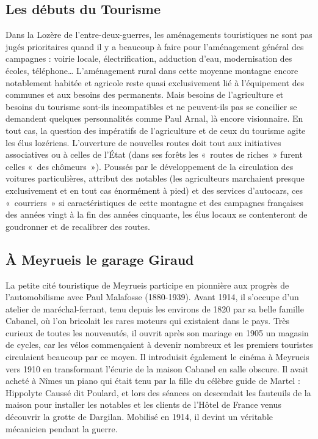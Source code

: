

\subsection{Les débuts du Tourisme}

Dans la Lozère de l’entre-deux-guerres, les aménagements touristiques ne sont pas jugés
prioritaires quand il y a beaucoup à faire pour l’aménagement général des campagnes : voirie
locale, électrification, adduction d’eau, modernisation des écoles, téléphone… L’aménagement
rural dans cette moyenne montagne encore notablement habitée et agricole reste quasi
exclusivement lié à l’équipement des communes et aux besoins des permanents. Mais besoins de
l’agriculture et besoins du tourisme sont-ils incompatibles et ne peuvent-ils pas se concilier se
demandent quelques personnalités comme Paul Arnal, là encore visionnaire.
En tout cas, la question des impératifs de l’agriculture et de ceux du tourisme agite les élus
lozériens. L’ouverture de nouvelles routes doit tout aux initiatives associatives ou à celles de
l’État (dans ses forêts les «~routes de riches~» furent celles «~des chômeurs~»). Poussés par le
développement de la circulation des voitures particulières, attribut des notables (les agriculteurs
marchaient presque exclusivement et en tout cas énormément à pied) et des services
d’autocars, ces «~courriers~» si caractéristiques de cette montagne et des campagnes françaises
des années vingt à la fin des années cinquante, les élus locaux se contenteront de goudronner et
de recalibrer des routes.

\subsection{À Meyrueis le garage Giraud}

La petite cité touristique de Meyrueis participe en pionnière aux progrès de l’automobilisme avec
Paul Malafosse (1880-1939). Avant 1914, il s’occupe d’un atelier de maréchal-ferrant, tenu
depuis les environs de 1820 par sa belle famille Cabanel, où l’on bricolait les rares moteurs qui
existaient dans le pays. Très curieux de toutes les nouveautés, il ouvrit après son mariage en 1905
un magasin de cycles, car les vélos commençaient à devenir nombreux et les premiers touristes circulaient beaucoup par ce moyen. Il introduisit également le cinéma à Meyrueis vers 1910 en transformant l’écurie de la maison Cabanel en salle obscure. Il avait acheté à Nîmes un piano qui était tenu par la fille du célèbre guide de Martel :
Hippolyte Caussé dit Poulard, et lors des séances on descendait les fauteuils de la maison pour
installer les notables et les clients de l’Hôtel de France venus découvrir la grotte de Dargilan.
Mobilisé en 1914, il devint un véritable mécanicien pendant la guerre.

